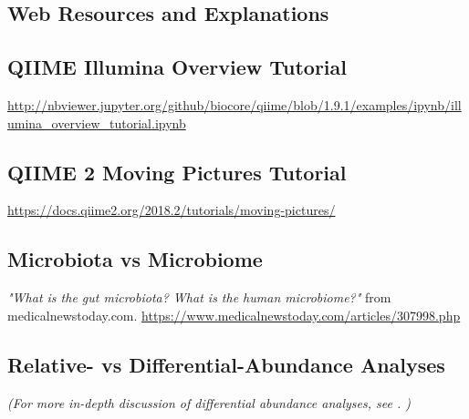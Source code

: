%
\begin{fullpage}

    \appendix
    \chapter{Web Resources and Explanations}
    
    
    \section{QIIME Illumina Overview Tutorial}
    \label{appendix:IlluminaOverTut}
    \url{http://nbviewer.jupyter.org/github/biocore/qiime/blob/1.9.1/examples/ipynb/illumina_overview_tutorial.ipynb}
    
    
    \section{QIIME 2 Moving Pictures Tutorial}
    \label{appendix:MovingPicTut}
    \url{https://docs.qiime2.org/2018.2/tutorials/moving-pictures/}


    \section{Microbiota vs Microbiome}
    \label{appendix:microbiome-vs-microbiota}
    \textit{"What is the gut microbiota? What is the human microbiome?"} from medicalnewstoday.com.
    \url{https://www.medicalnewstoday.com/articles/307998.php}


    \section{Relative- vs Differential-Abundance Analyses}
    \label{appendix:abundance-analyses}
    \textit{(For more in-depth discussion of differential abundance analyses, see \citep{Mandal2015a}. )}
    

\end{fullpage}
